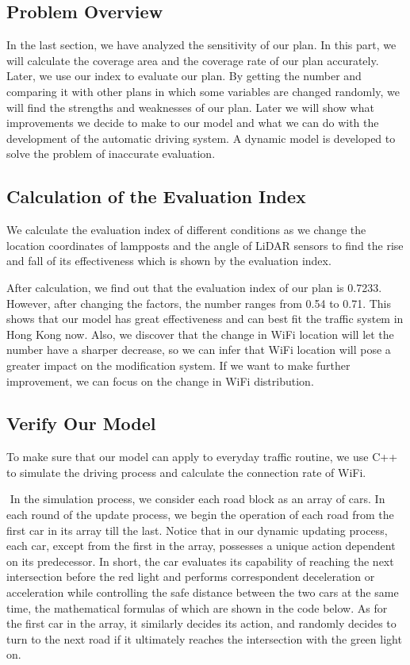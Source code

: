 \documentclass[12pt]{article}
\theoremstyle{definition}
\theoremstyle{remark}
\numberwithin{equation}{section}
\begin{document}
	\subsection{Problem Overview}
		In the last section, we have analyzed the sensitivity of our plan. In this part, we will calculate the coverage area and the coverage rate of our plan accurately. Later, we use our index to evaluate our plan. By getting the number and comparing it with other plans in which some variables are changed randomly, we will find the strengths and weaknesses of our plan. Later we will show what improvements we decide to make to our model and what we can do with the development of the automatic driving system. A dynamic model is developed to solve the problem of inaccurate evaluation.
	\subsection{Calculation of the Evaluation Index}
	We calculate the evaluation index of different conditions as we change the location coordinates of lampposts and the angle of LiDAR sensors to find the rise and fall of its effectiveness which is shown by the evaluation index. 
	
	After calculation, we find out that the evaluation index of our plan is 0.7233. However, after changing the factors, the number ranges from 0.54 to 0.71. This shows that our model has great effectiveness and can best fit the traffic system in Hong Kong now. Also, we discover that the change in WiFi location will let the number have a sharper decrease, so we can infer that WiFi location will pose a greater impact on the modification system. If we want to make further improvement, we can focus on the change in WiFi distribution.
	
	\subsection{Verify Our Model}
		To make sure that our model can apply to everyday traffic routine, we use C++ to simulate the driving process and calculate the connection rate of WiFi.
	
		​	In the simulation process, we consider each road block as an array of cars. In each round of the update process, we begin the operation of each road from the first car in its array till 	the last. Notice that in our dynamic updating process, each car, except from the first in the array, possesses a unique action dependent on its predecessor. In short, the car evaluates its capability of reaching the next intersection before the red light and performs correspondent deceleration or acceleration while controlling the safe distance between the two cars at the same time, the mathematical formulas of which are shown in the code below. As for the first car in the array, it similarly decides its action, and randomly decides to turn to the next road if it ultimately reaches the intersection with the green light on.
		
\end{document}
